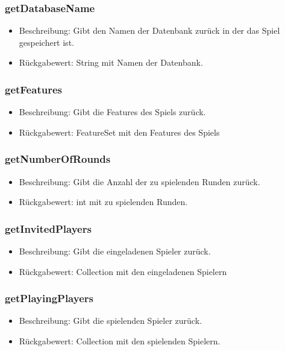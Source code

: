 \documentclass[a4paper]{scrreprt}
\begin{document}
	\subsubsection{getDatabaseName}
	\begin{itemize}
		\item Beschreibung: Gibt den Namen der Datenbank zurück in der das Spiel gespeichert ist.
		\item Rückgabewert: String mit Namen der Datenbank.
	\end{itemize}

	\subsubsection{getFeatures}
	\begin{itemize}
		\item Beschreibung: Gibt die Features des Spiels zurück.
		\item Rückgabewert: FeatureSet mit den Features des Spiels
	\end{itemize}

	\subsubsection{getNumberOfRounds}
	\begin{itemize}
		\item Beschreibung: Gibt die Anzahl der zu spielenden Runden zurück.
		\item Rückgabewert: int mit zu spielenden Runden.
	\end{itemize}

	\subsubsection{getInvitedPlayers}
	\begin{itemize}
		\item Beschreibung: Gibt die eingeladenen Spieler zurück.
		\item Rückgabewert: Collection mit den eingeladenen Spielern
	\end{itemize}

	\subsubsection{getPlayingPlayers}
	\begin{itemize}
		\item Beschreibung: Gibt die spielenden Spieler zurück.
		\item Rückgabewert: Collection mit den spielenden Spielern.
	\end{itemize}
\end{document}
